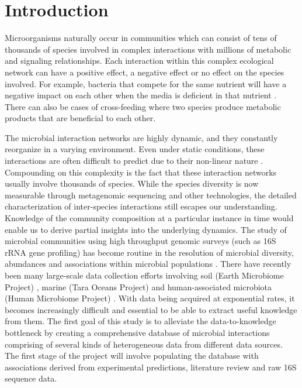 \section*{Introduction}

    Microorganisms naturally occur in communities which can consist of tens of thousands of species involved in complex interactions with millions of metabolic and signaling relationships.
    Each interaction within this complex ecological network can have a positive effect, a negative effect or no effect on the species involved.
    For example, bacteria that compete for the same nutrient will have a negative impact on each other when the media is deficient in that nutrient \cite{Ghoul2016}.
    There can also be cases of cross-feeding where two species produce metabolic products that are beneficial to each other.

    The microbial interaction networks are highly dynamic, and they constantly reorganize in a varying environment.
    Even under static conditions, these interactions are often difficult to predict due to their non-linear nature \cite{Konopka2015}.
    Compounding on this complexity is the fact that these interaction networks usually involve thousands of species.
    While the species diversity is now measurable through metagenomic sequencing and other technologies, the detailed characterization of inter-species interactions still escapes our understanding.
    Knowledge of the community composition at a particular instance in time would enable us to derive partial insights into the underlying dynamics.
    The study of microbial communities using high throughput genomic surveys (such as 16S rRNA gene profiling) has become routine in the resolution of microbial diversity, abundances and associations within microbial populations \cite{Jovel2016}.
    There have recently been many large-scale data collection efforts involving soil (Earth Microbiome Project) \cite{Thompson2017}, marine (Tara Oceans Project) \cite{Zhang2015} and human-associated microbiota (Human Microbiome Project) \cite{HumanMicrobiomeProjectConsortium2012}.
    With data being acquired at exponential rates, it becomes increasingly difficult and essential to be able to extract useful knowledge from them.
    The first goal of this study is to alleviate the data-to-knowledge bottleneck by creating a comprehensive database of microbial interactions comprising of several kinds of heterogeneous data from different data sources.
    The first stage of the project will involve populating the database with associations derived from experimental predictions, literature review and raw 16S sequence data.

